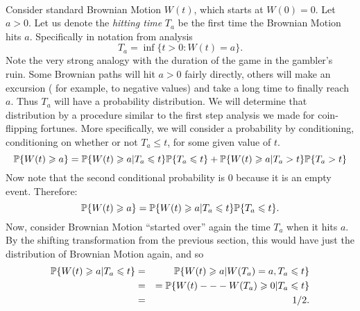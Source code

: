 \begin{solution}
\begin{solution}
\begin{solution}
\begin{solution}
\begin{solution}
\begin{solution}
\begin{solution}
\begin{solution}
\begin{solution}
\begin{solution}
{\begin{problem}
  \\
  Consider standard Brownian Motion $W(t)$, which starts at $W(0) = 0.$
  Let $ a > 0 $.  Let us denote the \emph{hitting time} $ T_a $ be the
  first time the Brownian Motion hits $ a $.  Specifically in notation
  from analysis
  $$
    T_a = \inf \{t > 0 :  W(t) = a \}.
  $$
  Note the very strong analogy with the duration of the game in the
  gambler's ruin. Some Brownian paths will hit $a>0$ fairly directly, 
  others will make an excursion ( for example, to negative values) and take 
  a long time to finally reach $a$. Thus $T_a$ will have a probability 
  distribution. We will determine that distribution by a procedure similar 
  to the first step analysis we made for coin-flipping fortunes. More specifically, 
  we will consider a probability by conditioning, conditioning on whether or not 
  $T_a \le t$, for some given value of $t$.
  $$
    \P\{W(t) \ge a\} = \P\{ W(t) \ge a | T_a \le t\} \P\{T_a \le t\} + 
    \P\{W(t) \ge a | T_a > t\} \P\{T_a > t\}
  $$
  Now note that the second conditional probability is $0$ because it is
  an empty event.  Therefore:
  $$
    \P\{ W(t) \ge a\} = \P\{ W(t) \ge a | T_a \le t\} \P\{T_a \le t\}.
  $$
  Now, consider Brownian Motion ``started over'' again the time $T_a$
  when it hits $a$.  By the shifting transformation from the previous
  section, this would have just the distribution of Brownian Motion again,
  and so
  \begin{eqnarray*}
    \P\{ W(t) \ge a | T_a \le t\} &=& \P\{ W(t) \ge a | W(T_a)=a,T_a\le t\} \\
    &=&= \P\{ W(t) --- W(T_a) \ge 0 | T_a \le t\} \\
    &=& 1/2.
  \end{eqnarray*}


\end{problem}}
\end{solution}
\end{solution}
\end{solution}
\end{solution}
\end{solution}
\end{solution}
\end{solution}
\end{solution}
\end{solution}
\end{solution}
